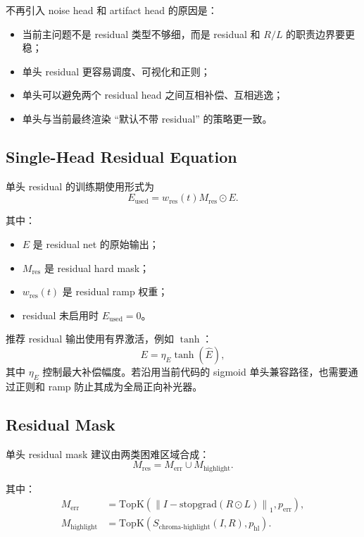 \documentclass[11pt]{article}
\begin{document}
不再引入 noise head 和 artifact head 的原因是：
\begin{itemize}[leftmargin=1.5em]
    \item 当前主问题不是 residual 类型不够细，而是 residual 和 $R/L$ 的职责边界要更稳；
    \item 单头 residual 更容易调度、可视化和正则；
    \item 单头可以避免两个 residual head 之间互相补偿、互相逃逸；
    \item 单头与当前最终渲染 ``默认不带 residual'' 的策略更一致。
\end{itemize}

\subsection{Single-Head Residual Equation}

单头 residual 的训练期使用形式为
\begin{equation}
    E_{\text{used}}
    =
    w_{\text{res}}(t)
    M_{\text{res}}
    \odot
    E.
\end{equation}

其中：
\begin{itemize}[leftmargin=1.5em]
    \item $E$ 是 residual net 的原始输出；
    \item $M_{\text{res}}$ 是 residual hard mask；
    \item $w_{\text{res}}(t)$ 是 residual ramp 权重；
    \item residual 未启用时 $E_{\text{used}}=0$。
\end{itemize}

推荐 residual 输出使用有界激活，例如 $\tanh$：
\begin{equation}
    E = \eta_E \tanh(\hat{E}),
\end{equation}
其中 $\eta_E$ 控制最大补偿幅度。若沿用当前代码的 sigmoid 单头兼容路径，也需要通过正则和 ramp 防止其成为全局正向补光器。

\subsection{Residual Mask}

单头 residual mask 建议由两类困难区域合成：
\begin{equation}
    M_{\text{res}} = M_{\text{err}} \cup M_{\text{highlight}}.
\end{equation}

其中：
\begin{align}
    M_{\text{err}}
    &=
    \mathrm{TopK}
    \left(
        \left\|I - \mathrm{stopgrad}(R \odot L)\right\|_1,
        p_{\text{err}}
    \right), \\
    M_{\text{highlight}}
    &=
    \mathrm{TopK}
    \left(
        S_{\text{chroma-highlight}}(I, R),
        p_{\text{hl}}
    \right).
\end{align}
\end{document}
